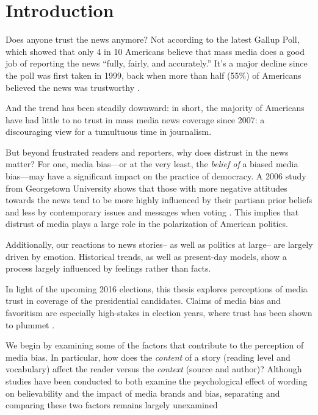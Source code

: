 
\chapter{Introduction} 

Does anyone trust the news anymore? Not according to the latest Gallup Poll, which showed that only 4 in 10 Americans believe that mass media does a good job of reporting the news ``fully, fairly, and accurately.'' It's a major decline since the poll was first taken in 1999, back when more than half (55\%) of Americans believed the news was trustworthy \cite{Gallup-trust-2015}.

And the trend has been steadily downward: in short, the majority of Americans have had little to no trust in mass media news coverage since 2007: a discouraging view for a tumultuous time in journalism.

But beyond frustrated readers and reporters, why does distrust in the news matter? For one, media bias---or at the very least, the \emph{belief of} a biased media bias---may have a significant impact on the practice of democracy. A 2006 study from Georgetown University shows that those with more negative attitudes towards the news tend to be more highly influenced by their partisan prior beliefs and less by contemporary issues and messages when voting \cite{ladd2005attitudes}. This implies that distrust of media plays a large role in the polarization of American politics.

Additionally, our reactions to news stories-- as well as politics at large-- are largely driven by emotion. Historical trends, as well as present-day models, show a process largely influenced by feelings rather than facts.


In light of the upcoming 2016 elections, this thesis explores perceptions of media trust in coverage of the presidential candidates. Claims of media bias and favoritism are especially high-stakes in election years, where trust has been shown to plummet \cite{Gallup-trust-2015}.  

We begin by examining some of the factors that contribute to the perception of media bias. In particular, how does the \emph{content} of a story (reading level and vocabulary) affect the reader versus the \emph{context} (source and author)? Although studies have been conducted to both examine the psychological effect of wording on believability and the impact of media brands and bias, separating and comparing these two factors remains largely unexamined \cite{weisberg2008seductive, baum2008eye}

